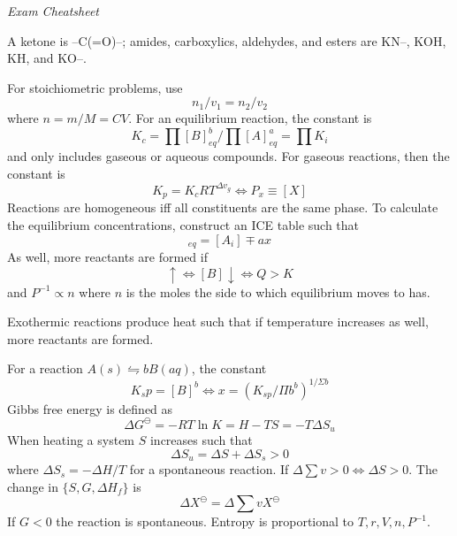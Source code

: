 \documentclass[11pt]{extarticle}
\begin{document}
\begin{multicols*}{2}
{\Large\textit{Exam Cheatsheet}}
\bigskip

A ketone is --C(=O)--; amides, carboxylics, aldehydes, and esters are KN--, KOH, KH, and KO--.

\bigskip
For stoichiometric problems, use
\begin{equation}
  n_1/v_1 = n_2/v_2
\end{equation}
where $n = m/M = CV$. For an equilibrium reaction, the constant is
\begin{equation}
  K_c = \textstyle\prod [B]_{eq}^b / \textstyle\prod [A]_{eq}^a = \textstyle\prod K_i
\end{equation}
and only includes gaseous or aqueous compounds. For gaseous reactions, then the constant is
\begin{equation}
  K_p = K_c RT ^{\Delta v_g} \iff P_x \equiv [X]
\end{equation}
Reactions are homogeneous iff all constituents are the same phase. To calculate the equilibrium concentrations, construct an ICE table such that
\begin{equation}
  [X_i]_{eq} = [A_i] \mp ax
\end{equation}
As well, more reactants are formed if
\begin{equation}
  [A] \uparrow \iff [B] \downarrow \iff Q > K
\end{equation}
and $P^{-1} \propto n$ where $n$ is the moles the side to which equilibrium moves to has.

\bigskip
Exothermic reactions produce heat such that if temperature increases as well, more reactants are formed.

\bigskip
For a reaction $A(s) \leftrightharpoons bB(aq)$, the constant
\begin{equation}
  K_sp = [B]^b \iff x = (K_{sp}/\Pi b^b)^{1/\Sigma b}
\end{equation}
Gibbs free energy is defined as
\begin{equation}
  \Delta G^\ominus = -RT \ln K = H - TS = -T \Delta S_u
\end{equation}
When heating a system $S$ increases such that \begin{equation}
  \Delta S_u = \Delta S + \Delta S_s >0
\end{equation}
where $\Delta S_s = - \Delta H/T$ for a spontaneous reaction. If $\Delta \sum v > 0 \iff \Delta S > 0$. The change in $\{S,G,\Delta H_f\}$ is
\begin{equation}
  \Delta X^\ominus = \Delta \textstyle\sum v X^\ominus
\end{equation}
If $G < 0$ the reaction is spontaneous. Entropy is proportional to $T,r,V,n,P^{-1}$.


\end{multicols*}
\end{document}
